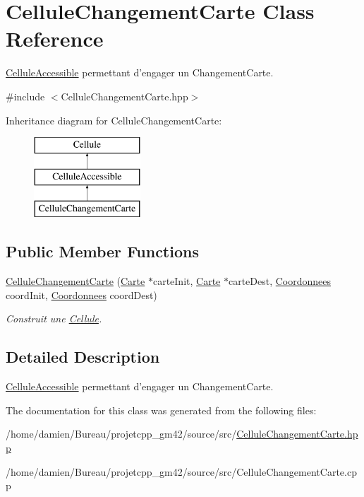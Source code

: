 \hypertarget{classCelluleChangementCarte}{\section{Cellule\-Changement\-Carte Class Reference}
\label{classCelluleChangementCarte}
}


\hyperlink{classCelluleAccessible}{Cellule\-Accessible} permettant d'engager un Changement\-Carte.  




{\ttfamily \#include $<$Cellule\-Changement\-Carte.\-hpp$>$}

Inheritance diagram for Cellule\-Changement\-Carte\-:\begin{figure}[H]
\begin{center}
\leavevmode
\includegraphics[height=3.000000cm]{classCelluleChangementCarte}
\end{center}
\end{figure}
\subsection*{Public Member Functions}
\begin{DoxyCompactItemize}
\item 
\hypertarget{classCelluleChangementCarte_a8c43a2087ebbfff9ff5346af569e4906}{\hyperlink{classCelluleChangementCarte_a8c43a2087ebbfff9ff5346af569e4906}{Cellule\-Changement\-Carte} (\hyperlink{classCarte}{Carte} $\ast$carte\-Init, \hyperlink{classCarte}{Carte} $\ast$carte\-Dest, \hyperlink{classCoordonnees}{Coordonnees} coord\-Init, \hyperlink{classCoordonnees}{Coordonnees} coord\-Dest)}\label{classCelluleChangementCarte_a8c43a2087ebbfff9ff5346af569e4906}

\begin{DoxyCompactList}\small\item\em Construit une \hyperlink{classCellule}{Cellule}. \end{DoxyCompactList}\end{DoxyCompactItemize}


\subsection{Detailed Description}
\hyperlink{classCelluleAccessible}{Cellule\-Accessible} permettant d'engager un Changement\-Carte. 

The documentation for this class was generated from the following files\-:\begin{DoxyCompactItemize}
\item 
/home/damien/\-Bureau/projetcpp\-\_\-gm42/source/src/\hyperlink{CelluleChangementCarte_8hpp}{Cellule\-Changement\-Carte.\-hpp}\item 
/home/damien/\-Bureau/projetcpp\-\_\-gm42/source/src/Cellule\-Changement\-Carte.\-cpp\end{DoxyCompactItemize}
